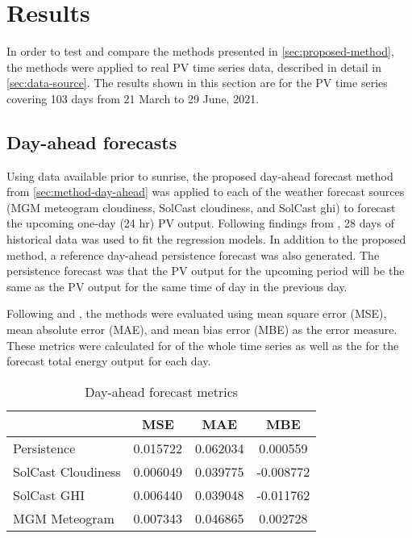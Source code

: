 \section{Results}
\label{sec:results}

In order to test and compare the methods presented in \cref{sec:proposed-method},
the methods were applied to real PV time series data, described in detail in \cref{sec:data-source}.
The results shown in this section are for the PV time series covering
103 days from 21 March to 29 June, 2021.

\subsection{Day-ahead forecasts}

Using data available prior to sunrise, the proposed day-ahead forecast method from  \cref{sec:method-day-ahead} was applied to each of the weather forecast sources
(MGM meteogram cloudiness, SolCast cloudiness, and SolCast ghi)
to forecast the upcoming one-day (24 hr) PV output.
Following findings from \cite{Almeida2015},
28 days of historical data was used to fit the regression models.
In addition to the proposed method, a reference day-ahead persistence forecast was also generated.
The persistence forecast was that the PV output for the upcoming period will be the same as the PV output for the same time of day in the previous day.

Following \cite{Pedro2012} and \cite{Gigoni2018}, the methods were evaluated using mean square error (MSE), mean absolute error (MAE), and mean bias error (MBE) as the error measure.
These metrics were calculated for of the whole time series as well as the for the forecast total energy output for each day.

\begin{table}[tbh]
	\centering
	\caption{Day-ahead forecast metrics}
	\label{table:dayahead-metrics}
	\begin{tabular}{lccc}
		\toprule
		                       &   MSE    &   MAE    &    MBE    \\
        \midrule
		Persistence & 0.015722 & 0.062034 & 0.000559 \\
		SolCast Cloudiness & 0.006049 & 0.039775 & -0.008772 \\
		SolCast GHI & 0.006440 & 0.039048 & -0.011762 \\
		MGM Meteogram & 0.007343 & 0.046865 & 0.002728 \\
		\bottomrule
	\end{tabular}
\end{table}

